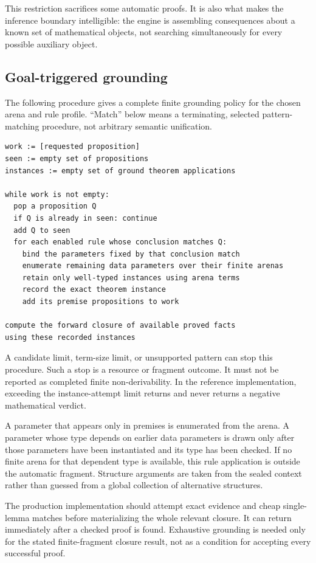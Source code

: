 \documentclass[11pt,a4paper]{article}
\newcommand{\code}[1]{\texttt{\detokenize{#1}}}
\theoremstyle{definition}
\theoremstyle{remark}
\begin{document}
This restriction sacrifices some automatic proofs. It is also what makes the
inference boundary intelligible: the engine is assembling consequences about
a known set of mathematical objects, not searching simultaneously for every
possible auxiliary object.

\subsection{Goal-triggered grounding}

The following procedure gives a complete finite grounding policy for the
chosen arena and rule profile. ``Match'' below means a terminating, selected
pattern-matching procedure, not arbitrary semantic unification.

\begin{lstlisting}
work := [requested proposition]
seen := empty set of propositions
instances := empty set of ground theorem applications

while work is not empty:
  pop a proposition Q
  if Q is already in seen: continue
  add Q to seen
  for each enabled rule whose conclusion matches Q:
    bind the parameters fixed by that conclusion match
    enumerate remaining data parameters over their finite arenas
    retain only well-typed instances using arena terms
    record the exact theorem instance
    add its premise propositions to work

compute the forward closure of available proved facts
using these recorded instances
\end{lstlisting}

A candidate limit, term-size limit, or unsupported pattern can stop this
procedure. Such a stop is a resource or fragment outcome. It must not be
reported as completed finite non-derivability. In the reference implementation,
exceeding the instance-attempt limit returns \code{resource_limit} and never
returns a negative mathematical verdict.

A parameter that appears only in premises is enumerated from the arena. A
parameter whose type depends on earlier data parameters is drawn only after
those parameters have been instantiated and its type has been checked. If no
finite arena for that dependent type is available, this rule application is
outside the automatic fragment. Structure arguments are taken from the sealed
context rather than guessed from a global collection of alternative structures.

The production implementation should attempt exact evidence and cheap
single-lemma matches before materializing the whole relevant closure. It can
return immediately after a checked proof is found. Exhaustive grounding is
needed only for the stated finite-fragment closure result, not as a condition
for accepting every successful proof.
\end{document}
